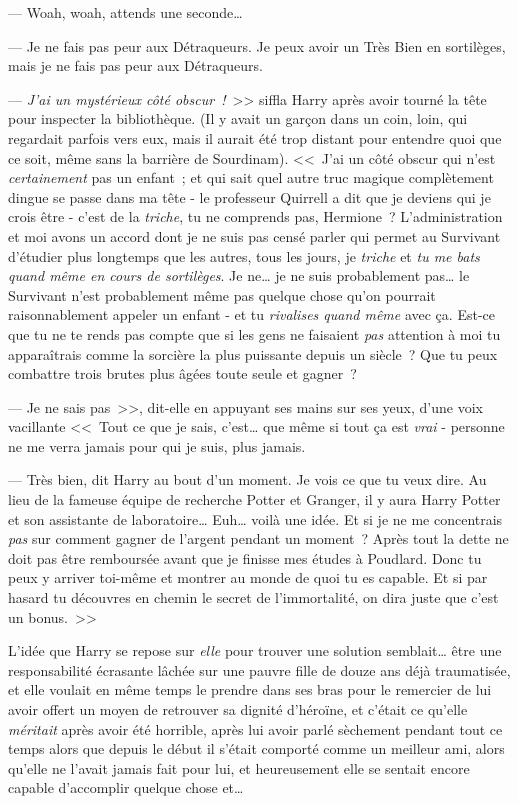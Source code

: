 --- Woah, woah, attends une seconde…

--- Je ne fais pas peur aux Détraqueurs. Je peux avoir un Très Bien en sortilèges, mais je ne fais pas peur aux Détraqueurs.

--- \emph{J'ai un mystérieux côté obscur~!}~>> siffla Harry après avoir tourné la tête pour inspecter la bibliothèque. (Il y avait un garçon dans un coin, loin, qui regardait parfois vers eux, mais il aurait été trop distant pour entendre quoi que ce soit, même sans la barrière de Sourdinam). <<~J'ai un côté obscur qui n'est \emph{certainement} pas un enfant~; et qui sait quel autre truc magique complètement dingue se passe dans ma tête - le professeur Quirrell a dit que je deviens qui je crois être - c'est de la \emph{triche}, tu ne comprends pas, Hermione~? L'administration et moi avons un accord dont je ne suis pas censé parler qui permet au Survivant d'étudier plus longtemps que les autres, tous les jours, je \emph{triche} et \emph{tu me bats quand même en cours de sortilèges}. Je ne… je ne suis probablement pas… le Survivant n'est probablement même pas quelque chose qu'on pourrait raisonnablement appeler un enfant - et tu \emph{rivalises quand même} avec ça. Est-ce que tu ne te rends pas compte que si les gens ne faisaient \emph{pas} attention à moi tu apparaîtrais comme la sorcière la plus puissante depuis un siècle~? Que tu peux combattre trois brutes plus âgées toute seule et gagner~?

--- Je ne sais pas~>>, dit-elle en appuyant ses mains sur ses yeux, d'une voix vacillante <<~Tout ce que je sais, c'est… que même si tout ça est \emph{vrai} - personne ne me verra jamais pour qui je suis, plus jamais.

--- Très bien, dit Harry au bout d'un moment. Je vois ce que tu veux dire. Au lieu de la fameuse équipe de recherche Potter et Granger, il y aura Harry Potter et son assistante de laboratoire… Euh… voilà une idée. Et si je ne me concentrais \emph{pas} sur comment gagner de l'argent pendant un moment~? Après tout la dette ne doit pas être remboursée avant que je finisse mes études à Poudlard. Donc tu peux y arriver toi-même et montrer au monde de quoi tu es capable. Et si par hasard tu découvres en chemin le secret de l'immortalité, on dira juste que c'est un bonus.~>>

L'idée que Harry se repose sur \emph{elle} pour trouver une solution semblait… être une responsabilité écrasante lâchée sur une pauvre fille de douze ans déjà traumatisée, et elle voulait en même temps le prendre dans ses bras pour le remercier de lui avoir offert un moyen de retrouver sa dignité d'héroïne, et c'était ce qu'elle \emph{méritait} après avoir été horrible, après lui avoir parlé sèchement pendant tout ce temps alors que depuis le début il s'était comporté comme un meilleur ami, alors qu'elle ne l'avait jamais fait pour lui, et heureusement elle se sentait encore capable d'accomplir quelque chose et…

